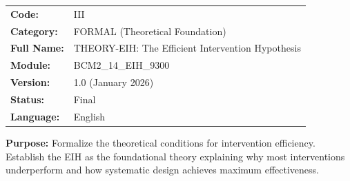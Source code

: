 %
%


\begin{tcolorbox}[colback=gray!5!white, colframe=gray!75!black,
    title=Appendix Header: III THEORY-EIH]

\begin{tabular}{@{}ll@{}}
\textbf{Code:} & III \\
\textbf{Category:} & FORMAL (Theoretical Foundation) \\
\textbf{Full Name:} & THEORY-EIH: The Efficient Intervention Hypothesis \\
\textbf{Module:} & BCM2\_14\_EIH\_9300 \\
\textbf{Version:} & 1.0 (January 2026) \\
\textbf{Status:} & Final \\
\textbf{Language:} & English \\
\end{tabular}

\vspace{0.5em}
\textbf{Purpose:} Formalize the theoretical conditions for intervention efficiency.
Establish the EIH as the foundational theory explaining why most interventions
underperform and how systematic design achieves maximum effectiveness.

\end{tcolorbox}


